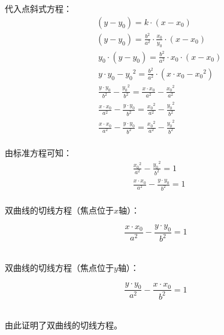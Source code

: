 \documentclass[UTF8]{ctexart}
\begin{document}
    代入点斜式方程：
    \begin{align}
        &(y-y_0)=k\cdot(x-x_0)\\[5mm]
        &(y-y_0)=\frac{b^2}{a^2}\cdot\frac{x_0}{y_0}\cdot(x-x_0)\\[5mm]
        &~y_0\cdot(y-y_0)=\frac{b^2}{a^2}\cdot x_0\cdot(x-x_0)\\[5mm]
        &~y\cdot y_0-{y_0}^2=\frac{b^2}{a^2}\cdot(x\cdot x_0-{x_0}^2)\\[5mm]
        &~\frac{y\cdot y_0}{b^2}-\frac{{y_0}^2}{b^2}=\frac{x\cdot x_0}{a^2}-\frac{{x_0}^2}{a^2}\\[5mm]
        &~\frac{x\cdot x_0}{a^2}-\frac{y\cdot y_0}{b^2}=\frac{{x_0}^2}{a^2}-\frac{{y_0}^2}{b^2}\\[5mm]
        &~\frac{x\cdot x_0}{a^2}-\frac{y\cdot y_0}{b^2}=\frac{{x_0}^2}{a^2}-\frac{{y_0}^2}{b^2}
    \end{align}\\
    由标准方程可知：
    \begin{align}
        &\frac{{x_0}^2}{a^2}-\frac{{y_0}^2}{b^2}=1\\[5mm]
        &\frac{x\cdot x_0}{a^2}-\frac{y\cdot y_0}{b^2}=1
    \end{align}\\
    双曲线的切线方程（焦点位于$x$轴）：
    \begin{large}
        \begin{equation*}
            \frac{x \cdot x_0}{a^2}-\frac{y \cdot y_0}{b^2}=1
        \end{equation*}
    \end{large}\\
    双曲线的切线方程（焦点位于$y$轴）：
    \begin{large}
        \begin{equation*}
            \frac{y \cdot y_0}{a^2}-\frac{x \cdot x_0}{b^2}=1
        \end{equation*}
    \end{large}\\
    由此证明了双曲线的切线方程。

\newpage
\end{document}
